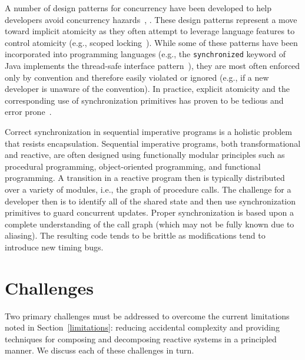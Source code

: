 A number of design patterns for concurrency have been developed to help developers avoid concurrency hazards~\cite{schmidt2000pattern}, \cite{lea2000concurrent}.
These design patterns represent a move toward implicit atomicity as they often attempt to leverage language features to control atomicity (e.g., scoped locking~\cite{schmidt2000pattern}).
While some of these patterns have been incorporated into programming languages (e.g., the \verb+synchronized+ keyword of Java implements the thread-safe interface pattern~\cite{schmidt2000pattern}), they are most often enforced only by convention and therefore easily violated or ignored (e.g., if a new developer is unaware of the convention).
In practice, explicit atomicity and the corresponding use of synchronization primitives has proven to be tedious and error prone~\cite{sutter2005software}.

Correct synchronization in sequential imperative programs is a holistic problem that resists encapsulation.
Sequential imperative programs, both transformational and reactive, are often designed using functionally modular principles such as procedural programming, object-oriented programming, and functional programming.
A transition in a reactive program then is typically distributed over a variety of modules, i.e., the graph of procedure calls.
The challenge for a developer then is to identify all of the shared state and then use synchronization primitives to guard concurrent updates.
Proper synchronization is based upon a complete understanding of the call graph (which may not be fully known due to aliasing).
The resulting code tends to be brittle as modifications tend to introduce new timing bugs.

\section{Challenges}
\label{challenges}

Two primary challenges must be addressed to overcome the current limitations noted in Section~\ref{limitations}:  reducing accidental complexity and providing techniques for composing and decomposing reactive systems in a principled manner.
We discuss each of these challenges in turn.

